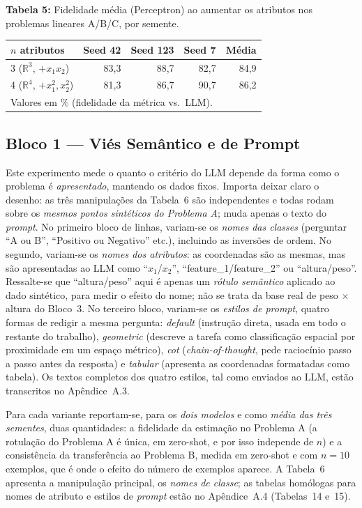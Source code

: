 \documentclass[12pt,a4paper]{article}
\begin{document}
\bigskip

\noindent \textbf{Tabela 5:} Fidelidade média (Perceptron) ao aumentar os atributos nos problemas lineares
A/B/C, por semente.

\begin{tabular}{lrrrr}
\toprule
\textbf{$n$ atributos} & \textbf{Seed 42} & \textbf{Seed 123} & \textbf{Seed 7} &
\textbf{Média} \\
\midrule
3 ($\mathbb{R}^3$, $+x_1 x_2$)          & 83,3 & 88,7 & 82,7 & 84,9 \\
4 ($\mathbb{R}^4$, $+x_1^2,x_2^2$)      & 81,3 & 86,7 & 90,7 & 86,2 \\
\bottomrule
\multicolumn{5}{l}{\footnotesize Valores em \% (fidelidade da métrica vs.\ LLM).}
\end{tabular}

\bigskip


\subsection{Bloco 1 — Viés Semântico e de Prompt}

Este experimento mede o quanto o critério do LLM depende da forma como o problema é
\emph{apresentado}, mantendo os dados fixos. Importa deixar claro o desenho: as três
manipulações da Tabela~6 são independentes e todas rodam sobre os
\emph{mesmos pontos sintéticos do Problema A}; muda apenas o texto do \emph{prompt}.
No primeiro bloco de linhas, variam-se os \emph{nomes das classes} (perguntar ``A ou B'',
``Positivo ou Negativo'' etc.), incluindo as inversões de ordem. No segundo, variam-se os
\emph{nomes dos atributos}:
as coordenadas são as mesmas, mas são apresentadas ao LLM como ``$x_1$/$x_2$'',
``feature\_1/feature\_2'' ou ``altura/peso''. Ressalte-se que ``altura/peso'' aqui é
apenas um \emph{rótulo semântico} aplicado ao dado sintético, para medir o efeito do nome;
não se trata da base real de peso $\times$ altura do Bloco~3. No terceiro bloco,
variam-se os \emph{estilos de prompt}, quatro formas de redigir a mesma pergunta:
\emph{default} (instrução direta, usada em todo o restante do trabalho), \emph{geometric}
(descreve a tarefa como classificação espacial por proximidade em um espaço métrico),
\emph{cot} (\emph{chain-of-thought}, pede raciocínio passo a passo antes da resposta) e
\emph{tabular} (apresenta as coordenadas formatadas como tabela). Os textos completos dos
quatro estilos, tal como enviados ao LLM, estão transcritos no
Apêndice~A.3.

Para cada variante reportam-se, para os \emph{dois modelos} e como \emph{média das três
sementes}, duas quantidades: a fidelidade da estimação no Problema A (a
rotulação do Problema A é única, em zero-shot, e por isso independe de $n$) e a
consistência da transferência ao Problema B, medida em zero-shot e com $n=10$ exemplos, que
é onde o efeito do número de exemplos aparece. A Tabela~6 apresenta a
manipulação principal, os \emph{nomes de classe}; as tabelas homólogas para nomes de
atributo e estilos de \emph{prompt} estão no Apêndice~A.4
(Tabelas~14 e~15).
\end{document}
